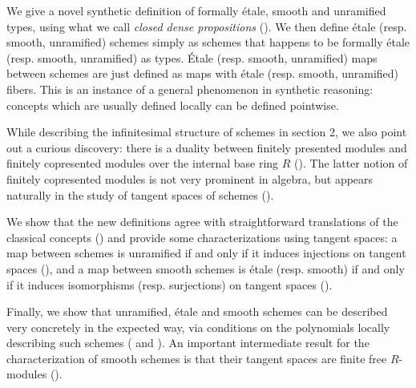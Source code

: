 We give a novel synthetic definition of formally étale, smooth and unramified types, using what we call \emph{closed dense propositions} (). We then define étale (resp. smooth, unramified) schemes simply as schemes that happens to be formally étale (resp. smooth, unramified) as types. Étale (resp. smooth, unramified) maps between schemes are just defined as maps with étale (resp. smooth, unramified) fibers.
This is an instance of a general phenomenon in synthetic reasoning: concepts which are usually defined locally can be defined pointwise. %

While describing the infinitesimal structure of schemes in section 2, we also point out a curious discovery: there is a duality between finitely presented modules and finitely copresented modules over the internal base ring $R$ ().
The latter notion of finitely copresented modules is not very prominent in algebra, but appears naturally in the study of tangent spaces of schemes ().

We show that the new definitions agree with straightforward translations of the classical concepts () and provide some characterizations using tangent spaces:
a map between schemes is unramified if and only if it induces injections on tangent spaces (), and a map between smooth schemes is étale (resp. smooth) if and only if it induces isomorphisms (resp. surjections) on tangent spaces ().

Finally, we show that unramified, étale and smooth schemes can be described very concretely in the expected way, via conditions on the polynomials locally describing such schemes ( and ). An important intermediate result for the characterization of smooth schemes is that their tangent spaces are finite free $R$-modules ().
